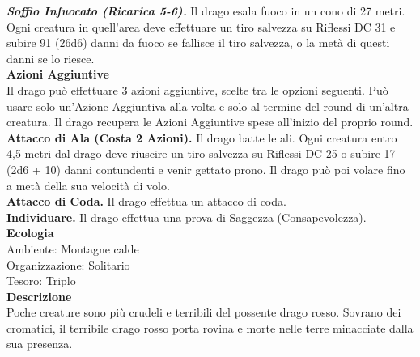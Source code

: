 \begin{multicols}{2}
\emph{\textbf{Soffio Infuocato (Ricarica 5-6).}} Il drago esala fuoco in un cono di 27 metri. Ogni creatura in quell'area deve effettuare un tiro salvezza su Riflessi DC  31 e subire 91 (26d6) danni da fuoco se fallisce il tiro salvezza, o la metà di questi danni se lo riesce.\\
\textbf{Azioni Aggiuntive}\\
Il drago può effettuare 3 azioni aggiuntive, scelte tra le opzioni seguenti. Può usare solo un'Azione Aggiuntiva alla volta e solo al termine del round di un'altra creatura. Il drago recupera le Azioni Aggiuntive spese all'inizio del proprio round.\\
\textbf{Attacco di Ala (Costa 2 Azioni).} Il drago batte le ali. Ogni creatura entro 4,5 metri dal  drago deve riuscire un tiro salvezza su Riflessi DC 25 o subire 17 (2d6 + 10) danni contundenti e venir gettato prono. Il drago può poi volare fino a metà della sua velocità di volo.\\
\textbf{Attacco di Coda.} Il drago effettua un attacco di coda.\\
\textbf{Individuare.} Il drago effettua una prova di Saggezza (Consapevolezza).\\	
\textbf{Ecologia}\\
Ambiente: Montagne calde\\
Organizzazione: Solitario\\
Tesoro: Triplo\\
\textbf{Descrizione}\\
Poche creature sono più crudeli e terribili del possente drago rosso. Sovrano dei cromatici, il terribile drago rosso porta rovina e morte nelle terre minacciate dalla sua presenza.\\


\end{multicols}

